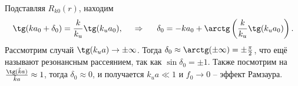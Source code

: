 Подставляя $R_{k0}(r)$, находим
\begin{equation*}
	\tg(k a_0 + \delta_0) = \frac{k}{k_u} \tg(k_u a_0),
	\hspace{0.5cm} \Rightarrow \hspace{0.5cm}
	\delta_0 = - k a_0 + \arctg\left(
		\frac{k}{k_u} \tg(k_u a_0)
	\right).
\end{equation*}
Рассмотрим случай $\tg(k_u a) \to \pm \infty$. Тогда $\delta_0 \approx \arctg(\pm\infty) = \pm\frac{\pi}{2}$, что ещё называют резонансным рассеянием, так как $\sin \delta_0 = \pm 1$.
Также посмотрим на $\frac{\tg(\tilde{k} a)}{\tilde{k} a} \approx	1$, тогда $\delta_0 \approx	0$, и получается $k_u a \ll 1$ и $f_0 \to 0$ -- эффект Рамзаура.
